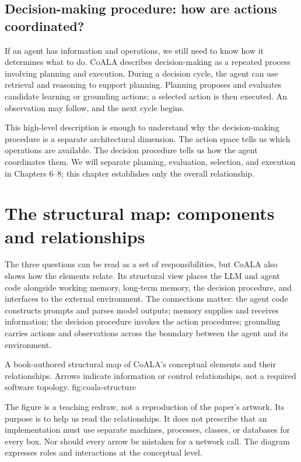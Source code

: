 \subsection{Decision-making procedure: how are actions coordinated?}

If an agent has information and operations, we still need to know how it determines what to do. CoALA describes decision-making as a repeated process involving planning and execution. During a decision cycle, the agent can use retrieval and reasoning to support planning. Planning proposes and evaluates candidate learning or grounding actions; a selected action is then executed. An observation may follow, and the next cycle begins.

This high-level description is enough to understand why the decision-making procedure is a separate architectural dimension. The action space tells us which operations are available. The decision procedure tells us how the agent coordinates them. We will separate planning, evaluation, selection, and execution in Chapters 6--8; this chapter establishes only the overall relationship.

\section{The structural map: components and relationships}

The three questions can be read as a set of responsibilities, but CoALA also shows how the elements relate. Its structural view places the LLM and agent code alongside working memory, long-term memory, the decision procedure, and interfaces to the external environment. The connections matter: the agent code constructs prompts and parses model outputs; memory supplies and receives information; the decision procedure invokes the action procedures; grounding carries actions and observations across the boundary between the agent and its environment.

  {A book-authored structural map of CoALA's conceptual elements and their relationships. Arrows indicate information or control relationships, not a required software topology.}
  {fig:coala-structure}

The figure is a teaching redraw, not a reproduction of the paper's artwork. Its purpose is to help us read the relationships. It does not prescribe that an implementation must use separate machines, processes, classes, or databases for every box. Nor should every arrow be mistaken for a network call. The diagram expresses roles and interactions at the conceptual level.

